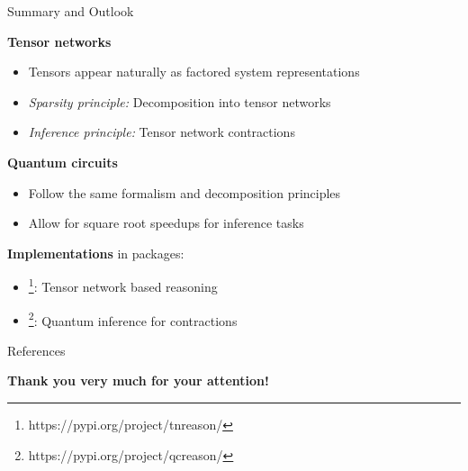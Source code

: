 \documentclass{beamer}
\begin{document}
    \begin{frame}{Summary and Outlook}

    {\bf Tensor networks}
        \begin{itemize}
            \item Tensors appear naturally as factored system representations
            \item \emph{Sparsity principle:} Decomposition into tensor networks
            \item \emph{Inference principle:} Tensor network contractions
        \end{itemize}

            {\bf Quantum circuits}
        \begin{itemize}
            \item Follow the same formalism and decomposition principles
            \item Allow for square root speedups for inference tasks
        \end{itemize}

            {\bf Implementations} in \python{} packages:
        \begin{itemize}
            \item {\bf \tnreason{}}\footnote{https://pypi.org/project/tnreason/}: Tensor network based reasoning
            \item {\bf \qcreason{}}\footnote{https://pypi.org/project/qcreason/}: Quantum inference for contractions
        \end{itemize}

    \end{frame}

    \begin{frame}{References}

        \begin{center}
            \bf Thank you very much for your attention!
        \end{center}

        \medskip

        \small

        
        

    \end{frame}
\end{document}
